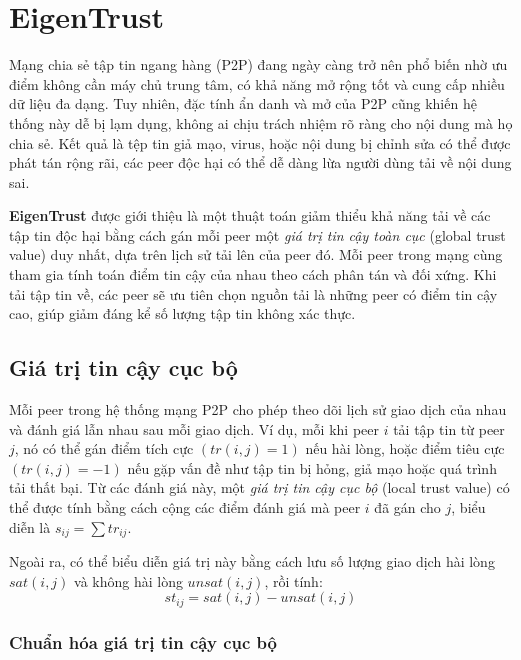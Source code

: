 \section{EigenTrust}

Mạng chia sẻ tập tin ngang hàng (P2P) đang ngày càng trở nên phổ biến nhờ ưu điểm không cần máy chủ trung tâm, có khả năng mở rộng tốt và cung cấp nhiều dữ liệu đa dạng.
Tuy nhiên, đặc tính ẩn danh và mở của P2P cũng khiến hệ thống này dễ bị lạm dụng, không ai chịu trách nhiệm rõ ràng cho nội dung mà họ chia sẻ. Kết quả là
tệp tin giả mạo, virus, hoặc nội dung bị chỉnh sửa có thể được phát tán rộng rãi, các peer độc hại có thể dễ dàng lừa người dùng tải về nội dung sai.

\textbf{EigenTrust} \cite{eigentrust-algorithm-for-reputation-management-in-2p2-networks} được giới thiệu là một thuật toán giảm thiểu khả năng tải về các tập tin độc hại
bằng cách gán mỗi peer một \textit{giá trị tin cậy toàn cục} (global trust value) duy nhất, dựa trên lịch sử tải lên của peer đó. Mỗi peer trong mạng cùng tham gia tính toán điểm tin cậy của nhau
theo cách phân tán và đối xứng. Khi tải tập tin về, các peer sẽ ưu tiên chọn nguồn tải là những peer có điểm tin cậy cao, giúp giảm đáng kể số lượng tập tin không xác thực.

\subsection{Giá trị tin cậy cục bộ}

Mỗi peer trong hệ thống mạng P2P cho phép theo dõi lịch sử giao dịch của nhau và đánh giá lẫn nhau sau mỗi giao dịch. Ví dụ, mỗi khi peer $i$ tải tập tin từ
peer $j$, nó có thể gán điểm tích cực $(tr(i, j) = 1)$ nếu hài lòng, hoặc điểm tiêu cực $(tr(i, j) = -1)$ nếu gặp vấn đề như tập tin bị hỏng, giả mạo hoặc quá trình tải thất bại.
Từ các đánh giá này, một \textit{giá trị tin cậy cục bộ} (local trust value) có thể được tính bằng cách cộng các điểm đánh giá mà peer $i$ đã gán cho $j$, biểu diễn là $s_{ij}=\sum tr_{ij}$.

Ngoài ra, có thể biểu diễn giá trị này bằng cách lưu số lượng giao dịch hài lòng $sat(i, j)$ và không hài lòng $unsat(i, j)$, rồi tính:
\[st_{ij} = sat(i, j) - unsat(i, j)\]

\subsubsection{Chuẩn hóa giá trị tin cậy cục bộ}

